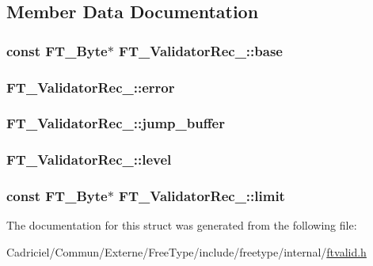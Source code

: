 \subsection{Member Data Documentation}
\hypertarget{struct_f_t___validator_rec___a62de459b75acae3e1695b3d6600ca22f}{
\subsubsection[{base}]{\setlength{\rightskip}{0pt plus 5cm}const {\bf F\-T\-\_\-\-Byte}$\ast$ F\-T\-\_\-\-Validator\-Rec\-\_\-\-::base}}\label{struct_f_t___validator_rec___a62de459b75acae3e1695b3d6600ca22f}
\hypertarget{struct_f_t___validator_rec___ab12d54f54a55a90ce19761a1c24e28f0}{
\subsubsection[{error}]{ F\-T\-\_\-\-Validator\-Rec\-\_\-\-::error}}\label{struct_f_t___validator_rec___ab12d54f54a55a90ce19761a1c24e28f0}
\hypertarget{struct_f_t___validator_rec___aa0b346f9ef78939e93c85389aa2b54b3}{
\subsubsection[{jump\-\_\-buffer}]{ F\-T\-\_\-\-Validator\-Rec\-\_\-\-::jump\-\_\-buffer}}\label{struct_f_t___validator_rec___aa0b346f9ef78939e93c85389aa2b54b3}
\hypertarget{struct_f_t___validator_rec___aa70830280c76507b8b06e616da8cb545}{
\subsubsection[{level}]{ F\-T\-\_\-\-Validator\-Rec\-\_\-\-::level}}\label{struct_f_t___validator_rec___aa70830280c76507b8b06e616da8cb545}
\hypertarget{struct_f_t___validator_rec___acc4d58a3e46d2b7c92bb51c3ddd8d331}{
\subsubsection[{limit}]{\setlength{\rightskip}{0pt plus 5cm}const {\bf F\-T\-\_\-\-Byte}$\ast$ F\-T\-\_\-\-Validator\-Rec\-\_\-\-::limit}}\label{struct_f_t___validator_rec___acc4d58a3e46d2b7c92bb51c3ddd8d331}


The documentation for this struct was generated from the following file\-:\begin{DoxyCompactItemize}
\item 
Cadriciel/\-Commun/\-Externe/\-Free\-Type/include/freetype/internal/\hyperlink{ftvalid_8h}{ftvalid.\-h}\end{DoxyCompactItemize}
